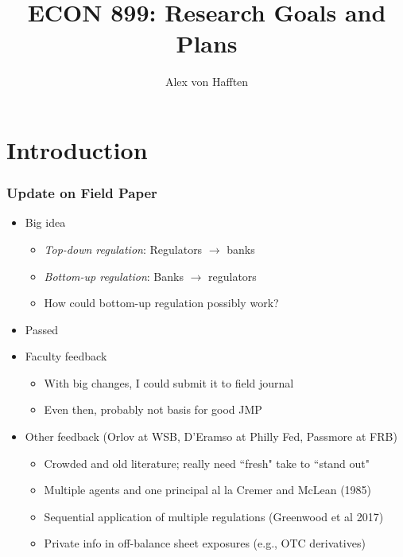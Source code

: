 \documentclass[usenames,dvipsnames, handout]{beamer}
\title[Research Goals and Plans]{ECON 899: Research Goals and Plans}
\author{Alex von Hafften}
\institute{UW-Madison}
\begin{document}
\begin{frame}
\titlepage
\end{frame}

\section{Introduction}


\begin{frame}
\frametitle{Update on Field Paper}
\small
\begin{itemize}[<+->]
\item Big idea
\begin{itemize}[<+->]
\item \textit{Top-down regulation}: Regulators $\rightarrow$ banks
\item \textit{Bottom-up regulation}: Banks $\rightarrow$ regulators
\item How could bottom-up regulation possibly work?
\end{itemize}
\bigskip
\item Passed
\bigskip
\item Faculty feedback
\begin{itemize}[<+->]
\item With big changes, I could submit it to field journal
\item Even then, probably not basis for good JMP
\end{itemize}
\bigskip
\item Other feedback (Orlov at WSB, D'Eramso at Philly Fed, Passmore at FRB)
\begin{itemize}[<+->]
\item Crowded and old literature; really need ``fresh" take to ``stand out"
\item Multiple agents and one principal al la Cremer and McLean (1985)
\item Sequential application of multiple regulations (Greenwood et al 2017)
\item Private info in off-balance sheet exposures (e.g., OTC derivatives)
\end{itemize}
\end{itemize}
\end{frame}
\end{document}

